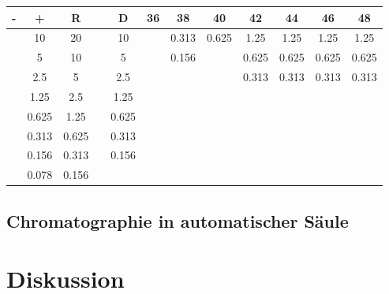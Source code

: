 \documentclass[a4paper,german]{scrreprt}
\begin{document}
\begin{tabu}{cccccccccccc}
	\toprule
	- & +      & R      & & D      & 36 & 38    & 40    & 42     & 44    & 46    & 48    \\
	\midrule
	  & 10     & 20     & & 10     &    & 0.313 & 0.625 & 1.25   & 1.25  & 1.25  & 1.25  \\ 
	  &  5     & 10     & &  5     &    & 0.156 &       & 0.625  & 0.625 & 0.625 & 0.625 \\ 
	  &  2.5   &  5     & &  2.5   &    &       &       & 0.313  & 0.313 & 0.313 & 0.313 \\ 
	  &  1.25  &  2.5   & &  1.25  &    &       &       &        &       &       &       \\ 
	  &  0.625 &  1.25  & &  0.625 &    &       &       &        &       &       &       \\ 
	  &  0.313 &  0.625 & &  0.313 &    &       &       &        &       &       &       \\ 
	  &  0.156 &  0.313 & &  0.156 &    &       &       &        &       &       &       \\ 
	  &  0.078 &  0.156 & &        &    &       &       &        &       &       &       \\ 
	\bottomrule
\end{tabu}

\section{Chromatographie in automatischer Säule} 

\chapter{Diskussion}



\end{document}
